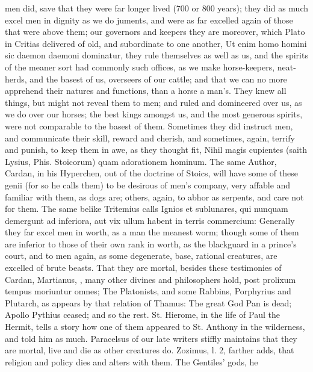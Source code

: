 {men did, save that they were far longer lived (700 or 800 years);
they did as much excel men in dignity as we do juments, and were as far
excelled again of those that were above them; our governors and
keepers they are moreover, which Plato in Critias delivered of
old, and subordinate to one another, Ut enim homo homini sic daemon
daemoni dominatur, they rule themselves as well as us, and the spirits
of the meaner sort had commonly such offices, as we make horse-keepers,
neat-herds, and the basest of us, overseers of our cattle; and that we
can no more apprehend their natures and functions, than a horse a
man's. They knew all things, but might not reveal them to men; and
ruled and domineered over us, as we do over our horses; the best kings
amongst us, and the most generous spirits, were not comparable to the
basest of them. Sometimes they did instruct men, and communicate their
skill, reward and cherish, and sometimes, again, terrify and punish, to
keep them in awe, as they thought fit, Nihil magis cupientes (saith
Lysius, Phis. Stoicorum) quam adorationem hominum. The same
Author, Cardan, in his Hyperchen, out of the doctrine of Stoics, will
have some of these genii (for so he calls them) to be desirous of
men's company, very affable and familiar with them, as dogs are;
others, again, to abhor as serpents, and care not for them. The same
belike Tritemius calls Ignios et sublunares, qui nunquam demergunt ad
inferiora, aut vix ullum habent in terris commercium: Generally
they far excel men in worth, as a man the meanest worm; though some of
them are inferior to those of their own rank in worth, as the
blackguard in a prince's court, and to men again, as some degenerate,
base, rational creatures, are excelled of brute beasts.
That they are mortal, besides these testimonies of Cardan, Martianus,
\etc{}, many other divines and philosophers hold, post prolixum tempus
moriuntur omnes; The Platonists, and some Rabbins, Porphyrius and
Plutarch, as appears by that relation of Thamus: The great God
Pan is dead; Apollo Pythius ceased; and so the rest. St. Hierome, in
the life of Paul the Hermit, tells a story how one of them appeared to
St. Anthony in the wilderness, and told him as much. Paracelsus
of our late writers stiffly maintains that they are mortal, live and
die as other creatures do. Zozimus, l. 2, farther adds, that religion
and policy dies and alters with them. The Gentiles' gods, he
}
